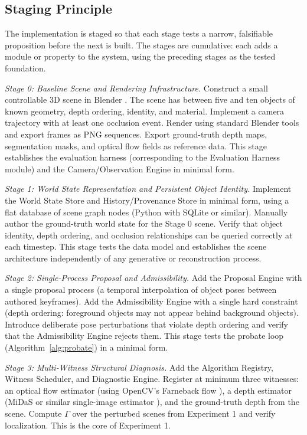 \documentclass[12pt,a4paper]{article}
\theoremstyle{plain}
\theoremstyle{definition}
\theoremstyle{remark}
\begin{document}
\subsection{Staging Principle}

The implementation is staged so that each stage tests a narrow, falsifiable proposition before the next is built. The stages are cumulative: each adds a module or property to the system, using the preceding stages as the tested foundation.

\textit{Stage 0: Baseline Scene and Rendering Infrastructure.} Construct a small controllable 3D scene in Blender \cite{blender2024}. The scene has between five and ten objects of known geometry, depth ordering, identity, and material. Implement a camera trajectory with at least one occlusion event. Render using standard Blender tools and export frames as PNG sequences. Export ground-truth depth maps, segmentation masks, and optical flow fields as reference data. This stage establishes the evaluation harness (corresponding to the Evaluation Harness module) and the Camera/Observation Engine in minimal form.

\textit{Stage 1: World State Representation and Persistent Object Identity.} Implement the World State Store and History/Provenance Store in minimal form, using a flat database of scene graph nodes (Python with SQLite or similar). Manually author the ground-truth world state for the Stage 0 scene. Verify that object identity, depth ordering, and occlusion relationships can be queried correctly at each timestep. This stage tests the data model and establishes the scene architecture independently of any generative or reconstruction process.

\textit{Stage 2: Single-Process Proposal and Admissibility.} Add the Proposal Engine with a single proposal process (a temporal interpolation of object poses between authored keyframes). Add the Admissibility Engine with a single hard constraint (depth ordering: foreground objects may not appear behind background objects). Introduce deliberate pose perturbations that violate depth ordering and verify that the Admissibility Engine rejects them. This stage tests the probate loop (Algorithm~\ref{alg:probate}) in a minimal form.

\textit{Stage 3: Multi-Witness Structural Diagnosis.} Add the Algorithm Registry, Witness Scheduler, and Diagnostic Engine. Register at minimum three witnesses: an optical flow estimator (using OpenCV's Farneback flow \cite{farneback2003}), a depth estimator (MiDaS or similar single-image estimator \cite{ranftl2020}), and the ground-truth depth from the scene. Compute $\Gamma$ over the perturbed scenes from Experiment 1 and verify localization. This is the core of Experiment 1.
\end{document}
